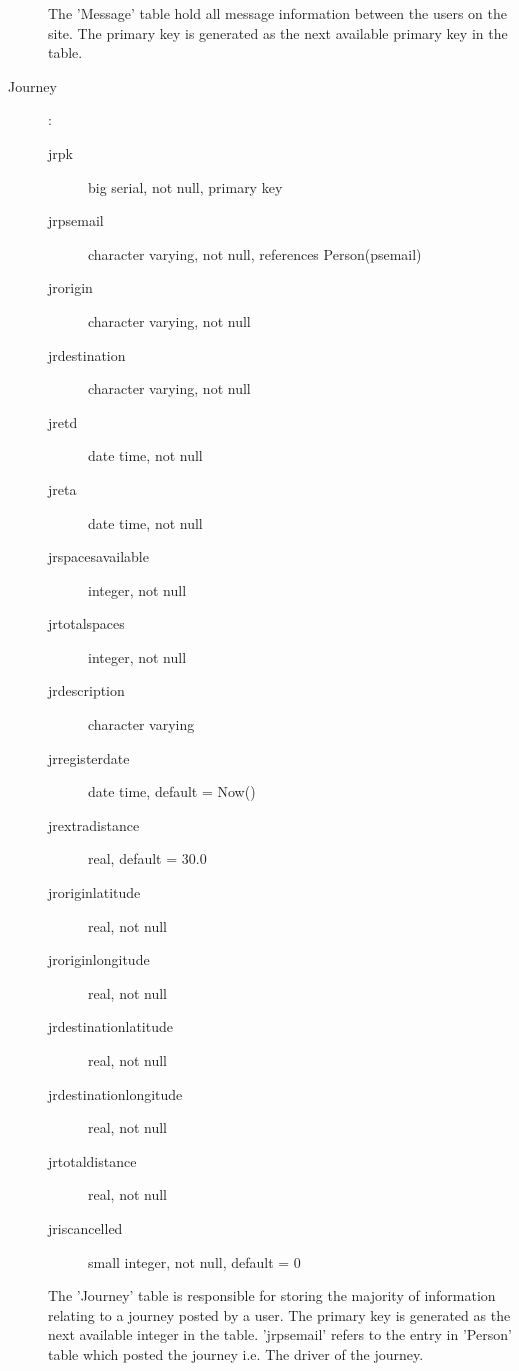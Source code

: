 \documentclass[11pt]{article}
\begin{document}
\begin{description}
The 'Message' table hold all message information between the users on the site. The primary key is generated as the next available primary key in the table.
	
\item[Journey]:

	\begin{description}
	\item[jr\textunderscore pk] big serial, not null, primary key
	\item[jr\textunderscore ps\textunderscore email] character varying, not null, references Person(ps\textunderscore email)
	\item[jr\textunderscore origin] character varying, not null
	\item[jr\textunderscore destination] character varying, not null
	\item[jr\textunderscore etd] date time, not null
	\item[jr\textunderscore eta] date time, not null
	\item[jr\textunderscore spaces\textunderscore available] integer, not null
	\item[jr\textunderscore total\textunderscore spaces] integer, not null
	\item[jr\textunderscore description] character varying
	\item[jr\textunderscore register\textunderscore date] date time, default = Now()
	\item[jr\textunderscore extra\textunderscore distance] real, default = 30.0
	\item[jr\textunderscore origin\textunderscore latitude] real, not null
	\item[jr\textunderscore origin\textunderscore longitude] real, not null
	\item[jr\textunderscore destination\textunderscore latitude] real, not null
	\item[jr\textunderscore destination\textunderscore longitude] real, not null
	\item[jr\textunderscore total\textunderscore distance] real, not null
	\item[jr\textunderscore is\textunderscore cancelled] small integer, not null, default = 0
	\end{description}
	
The 'Journey' table is responsible for storing the majority of information relating to a journey posted by a user. The primary key is generated as the next available integer in the table. 'jr\textunderscore ps\textunderscore email' refers to the entry in 'Person' table which posted the journey i.e. The driver of the journey.
	

\end{description}
\end{document}
